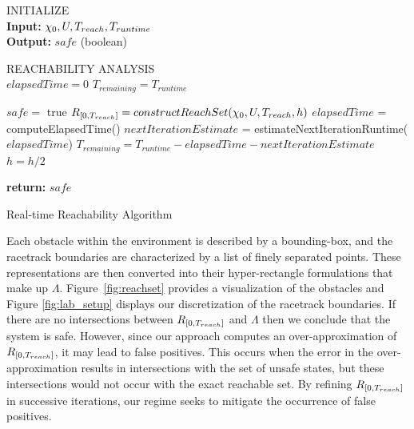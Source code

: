 \documentclass[manuscript,screen,review]{acmart}
\begin{document}
\begin{algorithm}[htbp]%
\DontPrintSemicolon 
INITIALIZE{
\\
\textbf{Input:} $\chi_0,\mathnormal{U},T_{reach}, T_{runtime}$ \\
\textbf{Output:} $safe$ (boolean)
}

\vspace{2mm}

REACHABILITY ANALYSIS\\
$elapsedTime = 0$\;
$T_{remaining} = T_{runtime}$\;
 {
    $safe = $ true\;
    $\mathnormal{R}_{[0,T_{reach}]}= constructReachSet(\chi_0,\mathnormal{U},T_{reach},h)$\;
    $elapsedTime$ = computeElapsedTime()\;
    $nextIterationEstimate$ = estimateNextIterationRuntime($elapsedTime$)\;
    $T_{remaining} = T_{runtime} -elapsedTime - nextIterationEstimate$\;
    $h = h /2$\;
    
    
    
}
\textbf{return:} $safe$
\caption{Real-time Reachability Algorithm}
\label{alg:algo_rtreach}
\end{algorithm}%

Each obstacle within the environment is described by a bounding-box, and the racetrack boundaries are characterized by a list of finely separated points. These representations are then converted into their hyper-rectangle formulations that make up $\Lambda$. Figure~\ref{fig:reachset} provides a visualization of the obstacles and Figure \ref{fig:lab_setup} displays our discretization of the racetrack boundaries. If there are no intersections between $\mathnormal{R}_{[0,T_{reach}]}$ and $\Lambda$ then we conclude that the system is safe. However, since our approach computes an  over-approximation of $\mathnormal{R}_{[0,T_{reach}]}$, it may lead to false positives. This occurs when the error in the over-approximation results in intersections with the set of unsafe states, but these intersections would not occur with the exact reachable set. By refining $\mathnormal{R}_{[0,T_{reach}]}$ in successive iterations, our regime seeks to mitigate the occurrence of false positives.  
\end{document}
